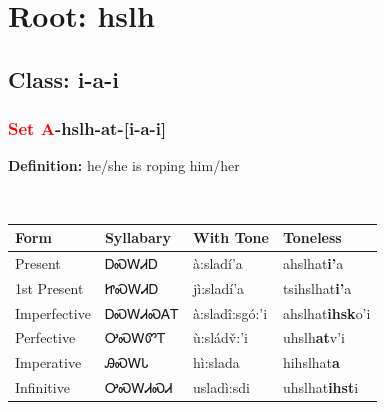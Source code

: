 \needspace{4in}
\section*{Root: hslh}
\nopagebreak
{}
\needspace{3in}
\subsection*{Class: i-a-i}
\nopagebreak
\needspace{2in}
\subsubsection*{\textcolor{Red}{Set A}{-}\textbf{hslh}{-}at{-}[i-a-i]}
\nopagebreak
\textbf{Definition: } he/she is roping him/her
\\[0.5em]
\begin{tabularx}{\textwidth}{l X X X}%
\toprule%
\textbf{Form}&\textbf{Syllabary}&\textbf{With Tone}&\textbf{Toneless}\\%
\midrule%
Present&ᎠᏍᎳᏗᎠ&à:sladí’a&ahslhat\textbf{i'}a\\%
1st Present&ᏥᏍᎳᏗᎠ&jì:sladí’a&tsihslhat\textbf{i'}a\\%
Imperfective&ᎠᏍᎳᏗᏍᎪᎢ&à:sladî:sgó:’i&ahslhat\textbf{ihsk}o'i\\%
Perfective&ᎤᏍᎳᏛᎢ&ù:sládv̌:’i&uhslh\textbf{at}v'i\\%
Imperative&ᎯᏍᎳᏓ&hì:slada&hihslhat\textbf{a}\\%
Infinitive&ᎤᏍᎳᏗᏍᏗ&usladì:sdi&uhslhat\textbf{ihst}i\\%
\bottomrule%
\end{tabularx}
\\[1em]